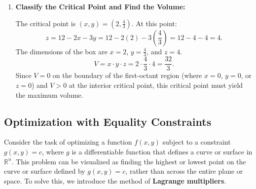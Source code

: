 \begin{example}
\begin{solution}
\begin{enumerate}
\begin{itemize}
        Factor equation (2):
        \[
        x(12 - 2x - 6y) = 0.
        \]
        Thus, \( x = 0 \) or \( 12 - 2x - 6y = 0 \), giving \( y = \frac{12 - 2x}{6} = 2 - \frac{x}{3} \).

        \item Solve the system of equations:
        Substituting \( y = \frac{12 - 4x}{3} \) into \( y = 2 - \frac{x}{3} \):
        \[
        \frac{12 - 4x}{3} = 2 - \frac{x}{3}.
        \]
        Multiply through by 3:
        \[
        12 - 4x = 6 - x \quad \Rightarrow \quad 3x = 6 \quad \Rightarrow \quad x = 2.
        \]
        Substitute \( x = 2 \) into \( y = 2 - \frac{x}{3} \):
        \[
        y = 2 - \frac{2}{3} = \frac{6}{3} - \frac{2}{3} = \frac{4}{3}.
        \]
    \end{itemize}

    \item \textbf{Classify the Critical Point and Find the Volume:}
    
    The critical point is \( (x, y) = (2, \frac{4}{3}) \). At this point:
    \[
    z = 12 - 2x - 3y = 12 - 2(2) - 3\left(\frac{4}{3}\right) = 12 - 4 - 4 = 4.
    \]
    The dimensions of the box are \( x = 2 \), \( y = \frac{4}{3} \), and \( z = 4 \).
    \[
    V = x \cdot y \cdot z = 2 \cdot \frac{4}{3} \cdot 4 = \frac{32}{3}.
    \]
    Since \( V = 0 \) on the boundary of the first-octant region (where \( x = 0 \), \( y = 0 \), or \( z = 0 \)) and \( V > 0 \) at the interior critical point, this critical point must yield the maximum volume.

\end{enumerate}
\end{solution}
\end{example}
\exampleline


\subsection*{Optimization with Equality Constraints} 

\noindent Consider the task of optimizing a function \( f(x, y) \) subject to a constraint \( g(x, y) = c \), where \( g \) is a differentiable function that defines a curve or surface in \( \mathbb{R}^n \). This problem can be visualized as finding the highest or lowest point on the curve or surface defined by \( g(x, y) = c \), rather than across the entire plane or space. To solve this, we introduce the method of \textbf{Lagrange multipliers}. \\

